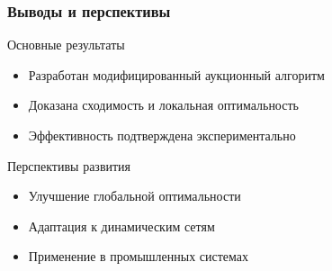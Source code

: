 \documentclass{beamer}
\begin{document}
	\begin{frame}
		\frametitle{Выводы и перспективы}
		\begin{block}{Основные результаты}
			\begin{itemize}
				\item Разработан модифицированный аукционный алгоритм
				\item Доказана сходимость и локальная оптимальность
				\item Эффективность подтверждена экспериментально
			\end{itemize}
		\end{block}
		
		\begin{block}{Перспективы развития}
			\begin{itemize}
				\item Улучшение глобальной оптимальности
				\item Адаптация к динамическим сетям
				\item Применение в промышленных системах
			\end{itemize}
		\end{block}
	\end{frame}
	
\end{document}

